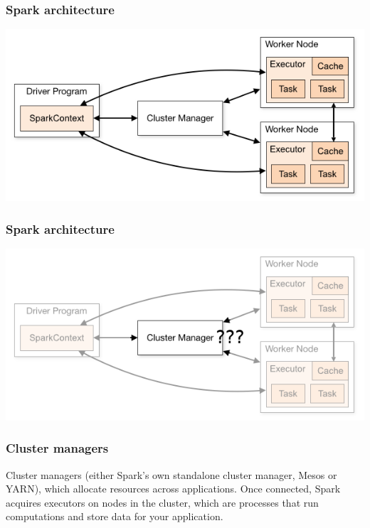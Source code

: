 \documentclass{beamer}
\begin{document}
\begin{frame}
  \frametitle{Spark architecture}
  \includegraphics[width=\textwidth]{images/cluster-overview.png}
  \end{frame}

\begin{frame}
  \frametitle{Spark architecture}
  \includegraphics[width=\textwidth]{images/cluster-overview-question.png}
\end{frame}


\begin{frame}
  \frametitle{Cluster managers}
  \large Cluster managers (either Spark’s own standalone cluster manager, Mesos or YARN), which allocate resources across applications. Once connected, Spark acquires executors on nodes in the cluster, which are processes that run computations and store data for your application.
\end{frame}
\end{document}
